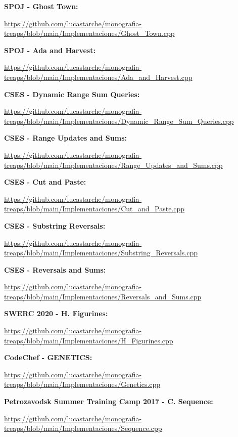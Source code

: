 \textbf{SPOJ - Ghost Town:}

\url{https://github.com/lucastarche/monografia-treaps/blob/main/Implementaciones/Ghost_Town.cpp}

\textbf{SPOJ - Ada and Harvest:} 

\url{https://github.com/lucastarche/monografia-treaps/blob/main/Implementaciones/Ada_and_Harvest.cpp}

\textbf{CSES - Dynamic Range Sum Queries:} 

\url{https://github.com/lucastarche/monografia-treaps/blob/main/Implementaciones/Dynamic_Range_Sum_Queries.cpp}

\textbf{CSES - Range Updates and Sums:} 

\url{https://github.com/lucastarche/monografia-treaps/blob/main/Implementaciones/Range_Updates_and_Sums.cpp}

\textbf{CSES - Cut and Paste:} 

\url{https://github.com/lucastarche/monografia-treaps/blob/main/Implementaciones/Cut_and_Paste.cpp}

\textbf{CSES - Substring Reversals:} 

\url{https://github.com/lucastarche/monografia-treaps/blob/main/Implementaciones/Substring_Reversals.cpp}

\textbf{CSES - Reversals and Sums:} 

\url{https://github.com/lucastarche/monografia-treaps/blob/main/Implementaciones/Reversals_and_Sums.cpp}

\textbf{SWERC 2020 - H. Figurines:} 

\url{https://github.com/lucastarche/monografia-treaps/blob/main/Implementaciones/H_Figurines.cpp}

\textbf{CodeChef - GENETICS:} 

\url{https://github.com/lucastarche/monografia-treaps/blob/main/Implementaciones/Genetics.cpp}

\textbf{Petrozavodsk Summer Training Camp 2017 - C. Sequence:}

\url{https://github.com/lucastarche/monografia-treaps/blob/main/Implementaciones/Sequence.cpp}